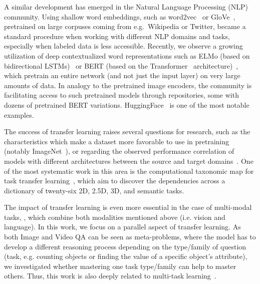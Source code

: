 A similar development has emerged in the Natural Language Processing (NLP) community.
Using shallow word embeddings, such as word2vec~\cite{mikolov2013distributed} or GloVe~\cite{pennington2014glove}, pretrained on large corpuses coming from e.g.\ Wikipedia or Twitter, became a standard procedure when working with different NLP domains and tasks, especially when labeled data is less accessible.
Recently, we observe a growing utilization of deep contextualized word representations such as ELMo (based on bidirectional LSTMs)~\cite{peters2018deep} or BERT (based on the Transformer~\cite{vaswani2017attention} architecture)~\cite{devlin2018bert}, which pretrain an entire network (and not just the input layer) on very large amounts of data.
In analogy to the pretrained image encoders, the community is facilitating access to such pretrained models through repositories, some with dozens of pretrained BERT variations. HuggingFace~\cite{wolf2019transformers} is one of the most notable examples.

The success of transfer learning raises several questions for research, such as the characteristics which make a dataset more favorable to use in pretraining (notably ImageNet~\cite{huh2016makes}), or regarding the observed performance correlation of models with different architectures between the source and target domains~\cite{kornblith2019better}.
One of the most systematic work in this area is the computational taxonomic map for task transfer learning~\cite{zamir2018taskonomy}, which aim to discover the dependencies across a dictionary of twenty-six 2D, 2.5D, 3D, and semantic tasks.

The impact of transfer learning is even more essential in the case of multi-modal tasks, \cite{mogadala2019trends}, which combine both modalities mentioned above (i.e. vision and language).
In this work, we focus on a parallel aspect of transfer learning. As both Image and Video QA can be seen as meta-problems, where the model has to develop a different reasoning process depending on the type/family of question (task, e.g. counting objects or finding the value of a specific object's attribute), we investigated whether mastering one task type/family can help to master others. Thus, this work is also deeply related to multi-task learning~\cite{caruana1997multitask}.

